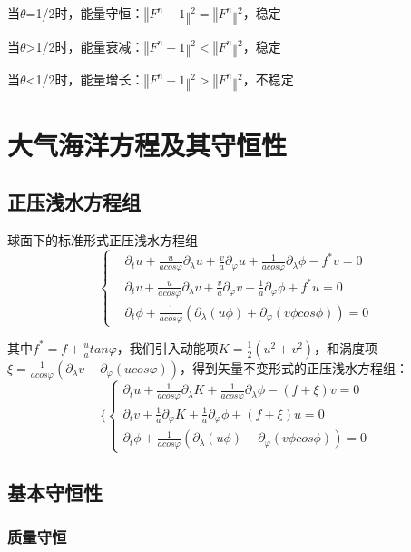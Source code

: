\documentclass{article}
\begin{document}
当$\theta$=1/2时，能量守恒：$‖F^n+1‖^2=‖F^n‖^2$，稳定

当$\theta$>1/2时，能量衰减：$‖F^n+1‖^2<‖F^n‖^2$，稳定

当$\theta$<1/2时，能量增长：$‖F^n+1‖^2>‖F^n‖^2$，不稳定

\section{大气海洋方程及其守恒性}
\subsection{正压浅水方程组}
球面下的标准形式正压浅水方程组
$$\begin{cases}
&{\partial_{t}u + \frac{u}{acos\varphi}\partial_{\lambda}u + \frac{v}{a}\partial_{\varphi}u + \frac{1}{acos\varphi}\partial_{\lambda}\phi - f^{*}v = 0} \\
&{\partial_{t}v + \frac{u}{acos\varphi}\partial_{\lambda}v + \frac{v}{a}\partial_{\varphi}v + \frac{1}{a}\partial_{\varphi}\phi + f^{*}u = 0} \\
&{\partial_{t}\phi + \frac{1}{acos\varphi}\left( {\partial_{\lambda}\left( {u\phi} \right) + \partial_{\varphi}\left( {v\phi cos\phi} \right)} \right) = 0}
\end{cases} $$

其中$f^{*} = f + \frac{u}{a}tan\varphi$，我们引入动能项$K = \frac{1}{2}\left( u^{2} + v^{2} \right)$，和涡度项$\xi = \frac{1}{acos\varphi}\left( {\partial_{\lambda}v - \partial_{\varphi}\left( {ucos\varphi} \right)} \right)$，得到矢量不变形式的正压浅水方程组：
$$\{ \begin{cases}
{\partial_{t}u + \frac{1}{acos\varphi}\partial_{\lambda}K + \frac{1}{acos\varphi}\partial_{\lambda}\phi - \left( {f + \xi} \right)v= 0} \\
{\partial_{t}v + \frac{1}{a}\partial_{\varphi}K + \frac{1}{a}\partial_{\varphi}\phi + \left( {f + \xi} \right)u = 0} \\
{\partial_{t}\phi + \frac{1}{acos\varphi}\left( {\partial_{\lambda}\left( {u\phi} \right) + \partial_{\varphi}\left( {v\phi cos\phi} \right)} \right)= 0}
\end{cases}$$

\subsection{基本守恒性}
\subsubsection{质量守恒}
\end{document}
